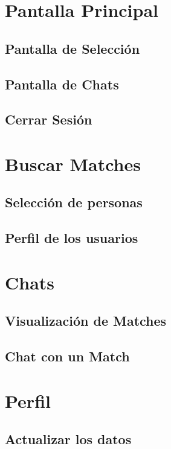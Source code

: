 \documentclass[10pt,letterpaper,extrafontsizes]{memoir}
\begin{document}
\chapter{Pantalla Principal}

\section{Pantalla de Selección}

\section{Pantalla de Chats}

\section{Cerrar Sesión}

\chapter{Buscar Matches}

\section{Selección de personas}

\section{Perfil de los usuarios}

\chapter{Chats}

\section{Visualización de Matches}

\section{Chat con un Match}

\chapter{Perfil}

\section{Actualizar los datos}
\end{document}
